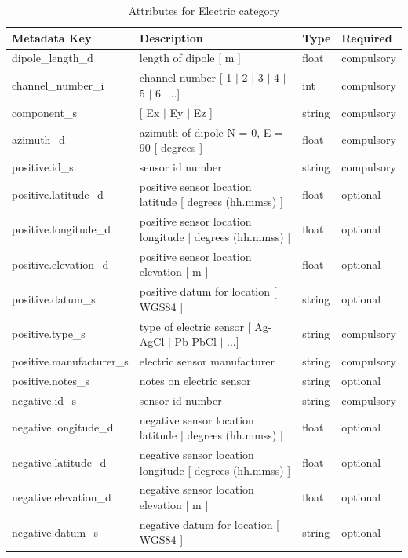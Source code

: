 \documentclass{article}
\begin{document}
\begin{table}[htb!]
	\caption[Attributes for Electric Channel]{Attributes for Electric category}
	\begin{tabular}{|l|p{3in}|l|l|}
		\hline
		\textbf{Metadata Key} & \textbf{Description} & \textbf{Type} & \textbf{Required} \\ \hline
		dipole\_length\_d & length of dipole [ m ] & float & compulsory \\ \hline
		channel\_number\_i & channel number [ 1 $|$ 2 $|$ 3 $|$ 4 $|$ 5 $|$ 6 $|$...] & int & compulsory \\ \hline
		component\_s & [ Ex $|$ Ey $|$ Ez ] & string  & compulsory \\ \hline
		azimuth\_d & azimuth of dipole N = 0,  E = 90 [ degrees ] & float & compulsory \\ \hline
		positive.id\_s & sensor id number & string & compulsory \\ \hline
		positive.latitude\_d & positive sensor location latitude [ degrees (hh.mmss) ] & float & optional \\ \hline
		positive.longitude\_d & positive sensor location longitude [ degrees (hh.mmss) ] & float & optional \\ \hline
		positive.elevation\_d & positive sensor location elevation [ m ] & float & optional \\ \hline
		positive.datum\_s & positive datum for location [ WGS84 ] & string & optional \\ \hline
		positive.type\_s & type of electric sensor [ Ag-AgCl $|$ Pb-PbCl $|$ ...] & string & compulsory \\ \hline
		positive.manufacturer\_s & electric sensor manufacturer & string & compulsory \\ \hline
		positive.notes\_s & notes on electric sensor & string & optional \\ \hline
		negative.id\_s & sensor id number & string & compulsory \\ \hline
		negative.longitude\_d & negative sensor location latitude [ degrees (hh.mmss) ] & float & optional \\ \hline
		negative.latitude\_d & negative sensor location longitude [ degrees (hh.mmss) ] & float & optional \\ \hline
		negative.elevation\_d & negative sensor location elevation [ m ] & float & optional \\ \hline
		negative.datum\_s & negative datum for location [ WGS84 ] & string & optional \\ \hline

\end{tabular}
\end{table}
\end{document}
